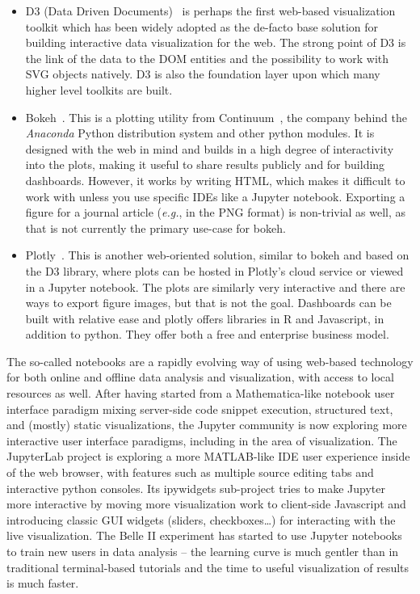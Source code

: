 \documentclass[12pt,a4paper]{article}
\begin{document}
\begin{itemize}
\item D3 (Data Driven Documents)~\cite{D32011} is perhaps the first web-based visualization toolkit which has been widely
adopted as the de-facto base solution for building interactive data visualization for the web. The strong point of D3 is the
link of the data to the DOM entities and the possibility to work with SVG objects natively. D3 is also the foundation layer
upon which many higher level toolkits are built.

\item Bokeh~\cite{Bokeh2014}. This is a plotting utility from Continuum~\cite{continuum}, the company behind the
\textit{Anaconda} Python distribution system and other python modules. It is designed with the web in mind and builds in a high degree of
interactivity into the plots, making it useful to share results publicly and for building dashboards. However, it works by
writing HTML, which makes it difficult to work with unless you use specific IDEs like a Jupyter notebook. Exporting a figure
for a journal article ({\it e.g.}, in the PNG format) is non-trivial as well, as that is not currently the primary use-case for bokeh.

\item Plotly~\cite{Plotly2015}. This is another web-oriented solution, similar to bokeh and based on the D3 library, where plots
can be hosted in Plotly’s cloud service or viewed in a Jupyter notebook. The plots are similarly very interactive and there
are ways to export figure images, but that is not the goal. Dashboards can be built with relative ease and plotly offers
libraries in R and Javascript, in addition to python. They offer both a free and enterprise business model.
\end{itemize}

The so-called notebooks are a rapidly evolving way of using web-based technology for both online and offline data analysis and
visualization, with access to local resources as well. After having started from a Mathematica-like notebook user interface
paradigm mixing server-side code snippet execution, structured text, and (mostly) static visualizations, the Jupyter community
is now exploring more interactive user interface paradigms, including in the area of visualization. The JupyterLab project is
exploring a more MATLAB-like IDE user experience inside of the web browser, with features such as multiple source editing tabs
and interactive python consoles. Its ipywidgets sub-project tries to make Jupyter more interactive by moving more visualization
work to client-side Javascript and introducing classic GUI widgets (sliders, checkboxes…) for interacting with the live visualization.
The Belle II experiment has started to use Jupyter notebooks to train new users in data analysis – the learning curve is much gentler than in
traditional terminal-based tutorials and the time to useful visualization of results is much faster.
\end{document}
